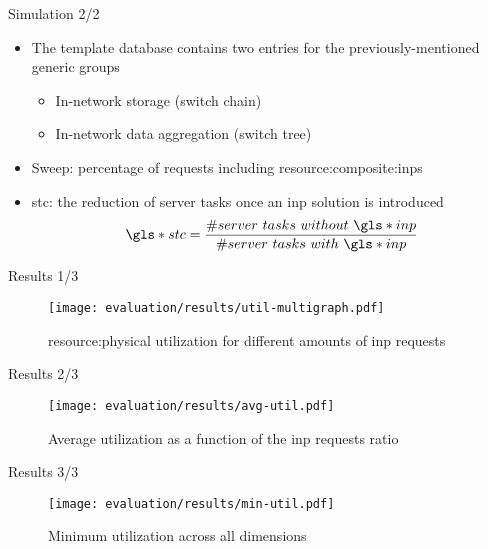 \begin{frame}{Simulation 2/2}
    \begin{itemize}
        \item The template database contains two entries for the previously-mentioned generic groups
        \begin{itemize}
            \item In-network storage (switch chain)
            \item In-network data aggregation (switch tree)
        \end{itemize}
        \item Sweep: percentage of requests including \glspl{resource:composite:inp}
        \item \gls*{stc}: the reduction of server tasks once an \gls*{inp} solution is introduced
        \vspace{3mm}
        \begin{equation*}
            \gls*{stc}=\dfrac{\#server\ tasks\ without\ \gls*{inp}}{\#server\ tasks\ with\ \gls*{inp}}
        \end{equation*}
    \end{itemize}
\end{frame}

\begin{frame}{Results 1/3}
    \begin{figure}
        \captionsetup{font=scriptsize}
        \texttt{[image: evaluation/results/util-multigraph.pdf]}
        \caption{\gls*{resource:physical} utilization for different amounts of \gls*{inp} requests}
    \end{figure}
\end{frame}

\begin{frame}{Results 2/3}
    \vspace{4mm}
    \begin{figure}
        \captionsetup{font=footnotesize}
        \texttt{[image: evaluation/results/avg-util.pdf]}
        \vspace{2mm}
        \caption{Average  utilization as a function of the \gls*{inp} requests ratio}
    \end{figure}
\end{frame}

\begin{frame}{Results 3/3}
    \vspace{2mm}
    \begin{figure}
        \captionsetup{font=footnotesize}
        \texttt{[image: evaluation/results/min-util.pdf]}
        \vspace{2mm}
        \caption{Minimum  utilization across all dimensions}
    \end{figure}
\end{frame}
